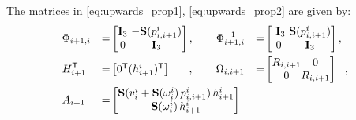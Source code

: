 \begin{algorithm}
%
%
%
%
The matrices in \eqref{eq:upwards_prop1}, \eqref{eq:upwards_prop2} are given by:
%
\begin{alignat*}{3}
&\Phi_{i+1,i} &=& \mat{
\mathbf{I}_{3} \!\!&\!\! -\mathbf{S}(p^{i}_{i,i+1}) \\
0     \!\!&\!\! \mathbf{I}_{3}
}, \quad \quad
%
\Phi^{-1}_{i+1,i} &=& \mat{
\,\, \mathbf{I}_{3} \!\!&\!\! \mathbf{S}(p^{i}_{i,i+1}) \\
0     \!\!&\!\! \mathbf{I}_{3}
}, \\
%
&H^\mathsf{T}_{i+1} &=& \mat{ 
0^\mathsf{T} \!\!\!&\!\!\! ( h^{i}_{i+1} )^\mathsf{T}
} \quad \,\,\,\,, \quad \quad
%
%
\Omega_{i,i+1} &=& \mat{ 
R_{i,i+1} \!\!\!&\!\!\! 0         \\ 
0          \!\!\!&\!\!\! R_{i,i+1} 
}\,\,\,\,,\\
%
&A_{i+1} &=& \mat{
\mathbf{S}(v^{i}_{i} + \mathbf{S}(\omega^{i}_{i}) \, p^{i}_{i,i+1}) \, h^{i}_{i+1} \\
\mathbf{S}(\omega^{i}_{i}) \, h^{i}_{i+1} }
\end{alignat*}
%

\end{algorithm}
